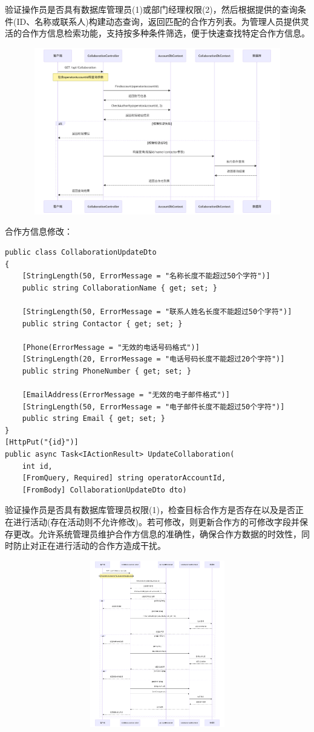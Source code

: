 \documentclass[]{article}
\let\oldincludegraphics\includegraphics
\renewcommand{\includegraphics}[2][]{%
  \begin{center}\oldincludegraphics[#1]{#2}\end{center}%
}
\begin{document}
验证操作员是否具有数据库管理员(1)或部门经理权限(2)，然后根据提供的查询条件(ID、名称或联系人)构建动态查询，返回匹配的合作方列表。为管理人员提供灵活的合作方信息检索功能，支持按多种条件筛选，便于快速查找特定合作方信息。

\includegraphics[width=5.64167in,height=2.86458in]{media/media/image_2-4-6.png}

合作方信息修改：

\begin{verbatim}
public class CollaborationUpdateDto
{
    [StringLength(50, ErrorMessage = "名称长度不能超过50个字符")]
    public string CollaborationName { get; set; }

    [StringLength(50, ErrorMessage = "联系人姓名长度不能超过50个字符")]
    public string Contactor { get; set; }

    [Phone(ErrorMessage = "无效的电话号码格式")]
    [StringLength(20, ErrorMessage = "电话号码长度不能超过20个字符")]
    public string PhoneNumber { get; set; }

    [EmailAddress(ErrorMessage = "无效的电子邮件格式")]
    [StringLength(50, ErrorMessage = "电子邮件长度不能超过50个字符")]
    public string Email { get; set; }
}
[HttpPut("{id}")]
public async Task<IActionResult> UpdateCollaboration(
    int id, 
    [FromQuery, Required] string operatorAccountId,
    [FromBody] CollaborationUpdateDto dto)
\end{verbatim}

验证操作员是否具有数据库管理员权限(1)，检查目标合作方是否存在以及是否正在进行活动(存在活动则不允许修改)。若可修改，则更新合作方的可修改字段并保存更改。允许系统管理员维护合作方信息的准确性，确保合作方数据的时效性，同时防止对正在进行活动的合作方造成干扰。

\includegraphics[width=5.64167in,height=2.86458in]{media/media/image_2-4-7.png}
\end{document}
